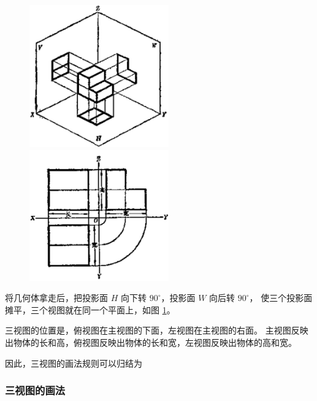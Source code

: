\begin{figure}[htbp]
    \centering
    \begin{minipage}[b]{7cm}
        \centering
        \includegraphics[width=6cm]{../pic/czjh2-ch8-13.png}
        \caption{}\label{fig:czjh2-8-13}
    \end{minipage}
    \begin{minipage}[b]{7cm}
        \centering
        \includegraphics[width=6cm]{../pic/czjh2-ch8-14.png}
        \caption{}\label{fig:czjh2-8-14}
    \end{minipage}
\end{figure}

将几何体拿走后，把投影面 $H$ 向下转 $90^\circ$，投影面 $W$ 向后转 $90^\circ$，
使三个投影面摊平，三个视图就在同一个平面上，如图 \ref{fig:czjh2-8-14}。

三视图的位置是，俯视图在主视图的下面，左视图在主视图的右面。
主视图反映出物体的长和高，俯视图反映出物体的长和宽，左视图反映出物体的高和宽。

因此，三视图的画法规则可以归结为

\begin{center}
\end{center}


\subsubsection{三视图的画法}

